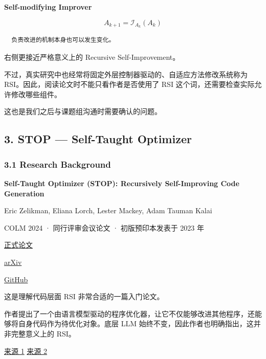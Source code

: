 \textbf{Self-modifying Improver}


\[A_{k+1}=\mathcal I_{A_k}(A_k)\]

\begin{verbatim}
  负责改进的机制本身也可以发生变化。
\end{verbatim}

右侧更接近严格意义上的 Recursive Self-Improvement。

不过，真实研究中也经常将固定外层控制器驱动的、自适应方法修改系统称为 RSI。因此，阅读论文时不能只看作者是否使用了 RSI 这个词，还需要检查实际允许修改哪些组件。

这也是我们之后与课题组沟通时需要确认的问题。

\hypertarget{part-3-37-0001-stop-self-taught-optimizer}{%
\subsection{3. STOP --- Self-Taught Optimizer}\label{part-3-37-0001-stop-self-taught-optimizer}}

\hypertarget{part-3-37-0001-research-background}{%
\subsubsection{3.1 Research Background}\label{part-3-37-0001-research-background}}

\textbf{Self-Taught Optimizer (STOP): Recursively Self-Improving Code Generation}

Eric Zelikman, Eliana Lorch, Lester Mackey, Adam Tauman Kalai

COLM 2024 · 同行评审会议论文 · 初版预印本发表于 2023 年

\href{https://proceedings.colm.cc/paper_files/paper/2024/hash/52eb24c316c78cc144dfa54f1f4bb4ec-Abstract-Conference.html}{正式论文}

\href{https://arxiv.org/abs/2310.02304}{arXiv}

\href{https://github.com/microsoft/STOP}{GitHub}

这是理解代码层面 RSI 非常合适的一篇入门论文。

作者提出了一个由语言模型驱动的程序优化器，让它不仅能够改进其他程序，还能够将自身代码作为待优化对象。底层 LLM 始终不变，因此作者也明确指出，这并非完整意义上的 RSI。

\href{https://proceedings.colm.cc/paper_files/paper/2024/hash/52eb24c316c78cc144dfa54f1f4bb4ec-Abstract-Conference.html}{来源 1} \href{https://openreview.net/pdf?id=46Zgqo4QIU}{来源 2}

